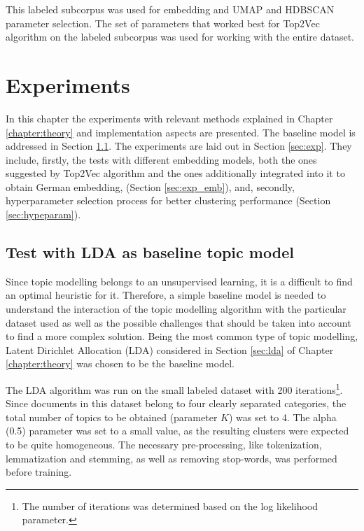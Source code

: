 \documentclass[fontsize=12pt,a4paper,twoside,openany]{scrbook}
\begin{document}
This labeled subcorpus was used for embedding and UMAP and HDBSCAN parameter selection. The set of parameters that worked best for Top2Vec algorithm on the labeled subcorpus was used for working with the entire dataset.

\chapter{Experiments}
\label{chap:exp}

In this chapter the experiments with relevant methods explained in Chapter \ref{chapter:theory} and implementation aspects are presented. The baseline model is addressed in Section \ref{sec:lda_baseline}. The experiments are laid out in Section \ref{sec:exp}. They include, firstly, the tests with different embedding models, both the ones suggested by Top2Vec algorithm and the ones additionally integrated into it to obtain German embedding, (Section \ref{sec:exp_emb}), and, secondly, hyperparameter selection process for better clustering performance (Section \ref{sec:hypeparam}).

\section{Test with LDA as baseline topic model}
\label{sec:lda_baseline}

Since topic modelling belongs to an unsupervised learning, it is a difficult to find an optimal heuristic for it. Therefore, a simple baseline model is needed to understand the interaction of the topic modelling algorithm with the particular dataset used as well as the possible challenges that should be taken into account to find a more complex solution. Being the most common type of topic modelling, Latent Dirichlet Allocation (LDA) considered in Section \ref{sec:lda} of Chapter \ref{chapter:theory} was chosen to be the baseline model.

The LDA algorithm was run on the small labeled dataset with 200 iterations\footnote{The number of iterations was determined based on the log likelihood parameter.}. Since documents in this dataset belong to four clearly separated categories, the total number of topics to be obtained (parameter \(K\)) was set to 4. The alpha (0.5) parameter was set to a small value, as the resulting clusters were expected to be quite homogeneous. The necessary pre-processing, like tokenization, lemmatization and stemming, as well as removing stop-words, was performed before training.
\end{document}
